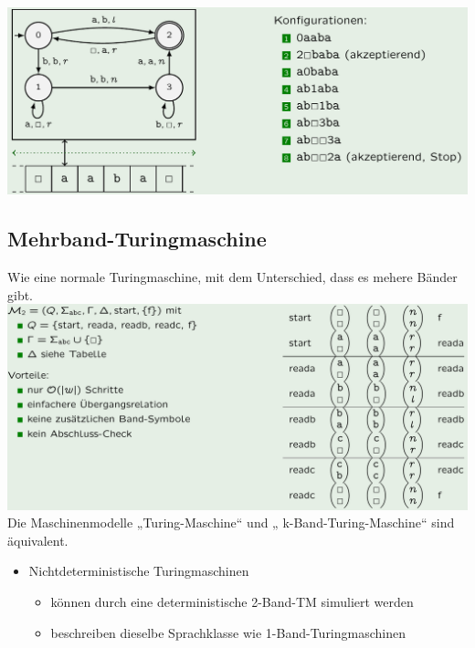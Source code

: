 \documentclass[12pt,a4paper]{article}
\begin{document}
	\begin{center}
	\includegraphics[width=\textwidth]{Bilder/Turing.png}
	\end{center}
	
	\subsection{Mehrband-Turingmaschine}
	Wie eine normale Turingmaschine, mit dem Unterschied, dass es mehere Bänder gibt.
	\includegraphics[width=\textwidth]{Bilder/MehrbandTuring.png}
	Die Maschinenmodelle „Turing-Maschine“ und „ k-Band-Turing-Maschine“ sind äquivalent.
	\begin{itemize}
		\item Nichtdeterministische Turingmaschinen
		\begin{itemize}
			\item können durch eine deterministische 2-Band-TM simuliert werden
			\item beschreiben dieselbe Sprachklasse wie 1-Band-Turingmaschinen
		\end{itemize}
	\end{itemize}
\end{document}
